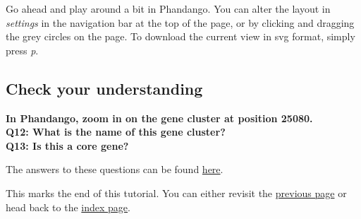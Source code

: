 \documentclass[11pt]{article}
\begin{document}
Go ahead and play around a bit in Phandango. You can alter the layout in
\textit{settings} in the navigation bar at the top of the page, or by
clicking and dragging the grey circles on the page. To download the
current view in svg format, simply press \textit{p}.

\hypertarget{check-your-understanding}{%
\subsection{Check your understanding}\label{check-your-understanding}}

\textbf{In Phandango, zoom in on the gene cluster at position 25080.}\\
\textbf{Q12: What is the name of this gene cluster?}\\
\textbf{Q13: Is this a core gene?}

The answers to these questions can be found \href{answers.ipynb}{here}.

This marks the end of this tutorial. You can either revisit the
\href{results.ipynb}{previous page} or head back to the
\href{index.ipynb}{index page}.


\end{document}
